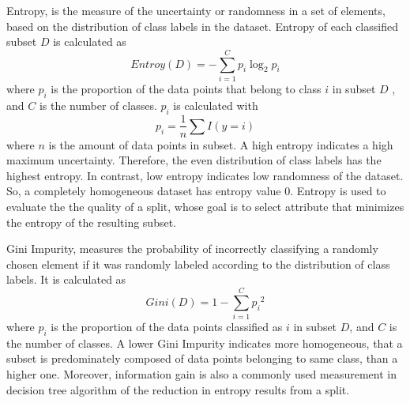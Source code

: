 \documentclass[12pt,a4paper,english
]{tunithesis}
\begin{document}
Entropy, is the measure of the uncertainty or randomness in a set of elements, based on the distribution of class labels in the dataset. Entropy of each classified subset ${D}$ is calculated as
\begin{equation}
    Entroy(D)=-\sum_{i = 1}^C {p_i} \log _2 {p_i}
\end{equation}
where ${p_i}$ is the proportion of the data points that belong to class ${i}$ in subset ${D}$ , and ${C}$ is the number of classes. ${p_i}$ is calculated with
\begin{equation}
    p_i = \frac{1}{n} \sum I(y=i)
\end{equation}
where ${n}$ is the amount of data points in subset.
A high entropy indicates a high maximum uncertainty. Therefore, the even distribution of class labels has the highest entropy. In contrast, low entropy indicates low randomness of the dataset. So, a completely homogeneous dataset has entropy value 0. Entropy is used to evaluate the the quality of a split, whose goal is to select attribute that minimizes the entropy of the resulting subset.

Gini Impurity, measures the probability of incorrectly classifying a randomly chosen element if it was randomly labeled according to the distribution of class labels. It is calculated as 
\begin{equation}
    Gini(D) = 1-\sum_{i=1}^C {p_i}^2
\end{equation}
where ${p_i}$ is the proportion of the data points classified as ${i}$ in subset ${D}$, and ${C}$ is the number of classes. A lower Gini Impurity indicates more homogeneous, that a subset is predominately composed of data points belonging to same class, than a higher one. Moreover, information gain is also a commonly used measurement in decision tree algorithm of the reduction in entropy results from a split.
\end{document}
